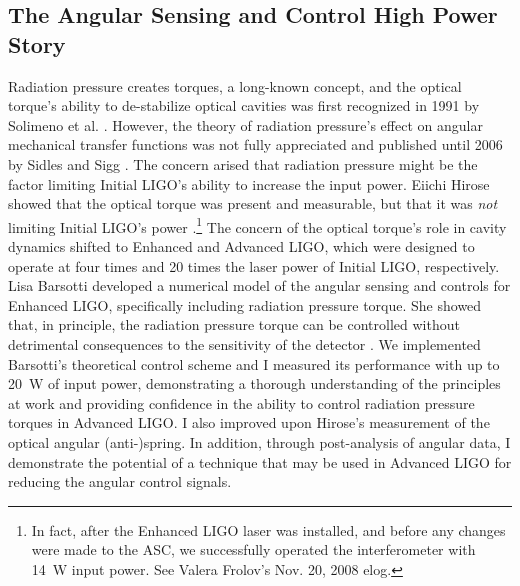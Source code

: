 \subsection{The Angular Sensing and Control High Power Story}
Radiation pressure creates torques, a long-known concept, and the
optical torque's ability to de-stabilize optical cavities was first
recognized in 1991 by Solimeno et
al. \cite{Solimeno1991FabryPerot}. However, the theory of radiation
pressure's effect on angular mechanical transfer functions was not
fully appreciated and published until 2006 by Sidles and Sigg
\cite{Sidles2006Optical}. The concern arised that radiation pressure
might be the factor limiting Initial LIGO's ability to increase the
input power. Eiichi Hirose showed that the optical torque was present
and measurable, but that it was \emph{not} limiting Initial LIGO's
power \cite{Hirose2010Angular}.\footnote{In fact, after the Enhanced
  LIGO laser was installed, and before any changes were made to the
  ASC, we successfully operated the interferometer with 14~W input
  power. See Valera Frolov's Nov. 20, 2008 elog.} The concern of the
optical torque's role in cavity dynamics shifted to Enhanced and
Advanced LIGO, which were designed to operate at four times and 20
times the laser power of Initial LIGO, respectively. Lisa Barsotti
developed a numerical model of the angular sensing and controls for
Enhanced LIGO, specifically including radiation pressure torque. She
showed that, in principle, the radiation pressure torque can be
controlled without detrimental consequences to the sensitivity of the
detector \cite{Barsotti2009Modeling}. We implemented Barsotti's
theoretical control scheme and I measured its performance with up to
20~W of input power, demonstrating a thorough understanding of the
principles at work and providing confidence in the ability to control
radiation pressure torques in Advanced LIGO. I also improved upon
Hirose's measurement of the optical angular (anti-)spring. In
addition, through post-analysis of angular data, I demonstrate the
potential of a technique that may be used in Advanced LIGO for
reducing the angular control signals.



